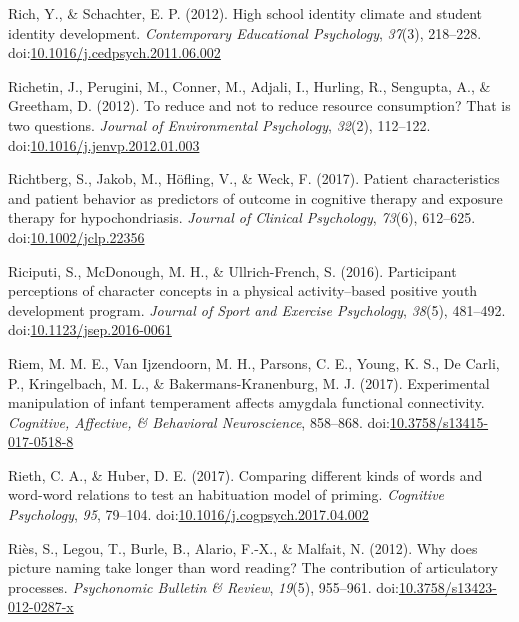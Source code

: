 \documentclass[english,man]{apa6}
\begin{document}
\hypertarget{ref-Rich2012}{}
Rich, Y., \& Schachter, E. P. (2012). High school identity climate and
student identity development. \emph{Contemporary Educational
Psychology}, \emph{37}(3), 218--228.
doi:\href{https://doi.org/10.1016/j.cedpsych.2011.06.002}{10.1016/j.cedpsych.2011.06.002}

\hypertarget{ref-Richetin2012}{}
Richetin, J., Perugini, M., Conner, M., Adjali, I., Hurling, R.,
Sengupta, A., \& Greetham, D. (2012). To reduce and not to reduce
resource consumption? That is two questions. \emph{Journal of
Environmental Psychology}, \emph{32}(2), 112--122.
doi:\href{https://doi.org/10.1016/j.jenvp.2012.01.003}{10.1016/j.jenvp.2012.01.003}

\hypertarget{ref-Richtberg2017}{}
Richtberg, S., Jakob, M., Höfling, V., \& Weck, F. (2017). Patient
characteristics and patient behavior as predictors of outcome in
cognitive therapy and exposure therapy for hypochondriasis.
\emph{Journal of Clinical Psychology}, \emph{73}(6), 612--625.
doi:\href{https://doi.org/10.1002/jclp.22356}{10.1002/jclp.22356}

\hypertarget{ref-Riciputi2016}{}
Riciputi, S., McDonough, M. H., \& Ullrich-French, S. (2016).
Participant perceptions of character concepts in a physical
activity--based positive youth development program. \emph{Journal of
Sport and Exercise Psychology}, \emph{38}(5), 481--492.
doi:\href{https://doi.org/10.1123/jsep.2016-0061}{10.1123/jsep.2016-0061}

\hypertarget{ref-Riem2017}{}
Riem, M. M. E., Van Ijzendoorn, M. H., Parsons, C. E., Young, K. S., De
Carli, P., Kringelbach, M. L., \& Bakermans-Kranenburg, M. J. (2017).
Experimental manipulation of infant temperament affects amygdala
functional connectivity. \emph{Cognitive, Affective, \& Behavioral
Neuroscience}, 858--868.
doi:\href{https://doi.org/10.3758/s13415-017-0518-8}{10.3758/s13415-017-0518-8}

\hypertarget{ref-Rieth2017}{}
Rieth, C. A., \& Huber, D. E. (2017). Comparing different kinds of words
and word-word relations to test an habituation model of priming.
\emph{Cognitive Psychology}, \emph{95}, 79--104.
doi:\href{https://doi.org/10.1016/j.cogpsych.2017.04.002}{10.1016/j.cogpsych.2017.04.002}

\hypertarget{ref-Ries2012}{}
Riès, S., Legou, T., Burle, B., Alario, F.-X., \& Malfait, N. (2012).
Why does picture naming take longer than word reading? The contribution
of articulatory processes. \emph{Psychonomic Bulletin \& Review},
\emph{19}(5), 955--961.
doi:\href{https://doi.org/10.3758/s13423-012-0287-x}{10.3758/s13423-012-0287-x}
\end{document}
